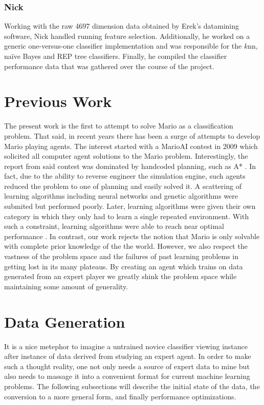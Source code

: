 \documentclass[]{article}   %
\begin{document}
\subsubsection{Nick}
Working with the raw 4697 dimension data obtained by Erek's datamining software, Nick handled running feature selection. Additionally, he worked on a generic one-versus-one classifier implementation and was responsible for the $k$nn, na\"{i}ve Bayes and REP tree classifiers. Finally, he compiled the classifier performance data that was gathered over the course of the project.

\section{Previous Work}
\label{sec:prevwork}
The present work is the first to attempt to solve Mario as a classification problem.  That said, in recent years there has been a surge of attempts to develop Mario playing agents.  The interest started with a MarioAI contest in 2009 which solicited all computer agent solutions to the Mario problem.  Interestingly, the report from said contest was dominated by handcoded planning, such as A* \cite{marioaicompetiton}.  In fact, due to the ability to reverse engineer the simulation engine, such agents reduced the problem to one of planning and easily solved it.  A scattering of learning algorithms including neural networks and genetic algorithms were submited but performed poorly.  Later, learning algorithms were given their own category in which they only had to learn a single repeated environment. With such a constraint, learning algorithms were able to reach near optimal performance \cite{speed}. In contrast, our work rejects the notion that Mario is only solvable with complete prior knowledge of the the world.  However, we also respect the vastness of the problem space and the failures of past learning problems in getting lost in its many plateaus.  By creating an agent which trains on data generated from an expert player we greatly shink the problem space while maintaining some amount of generality.  



\section{Data Generation}     %
\label{sec:datagen}
It is a nice metephor to imagine a untrained novice classifier viewing instance after instance of data derived from studying an expert agent.  In order to make such a thought reality, one not only needs a source of expert data to mine but also needs to massage it into a convenient format for current machine learning problems.  The following subsections will describe the initial state of the data, the conversion to a more general form, and finally performance optimizations.
\end{document}
